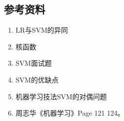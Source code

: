 \documentclass[letterpaper,10pt,english]{sphinxmanual}
\begin{document}
\subsection{参考资料}
\label{\detokenize{machineLearning/02_svm:id6}}\begin{enumerate}
\item {} 
LR与SVM的异同

\end{enumerate}
\begin{quote}

\end{quote}
\begin{enumerate}
\setcounter{enumi}{1}
\item {} 
核函数

\end{enumerate}
\begin{quote}

\end{quote}
\begin{enumerate}
\setcounter{enumi}{2}
\item {} 
SVM面试题

\end{enumerate}
\begin{quote}

\end{quote}
\begin{enumerate}
\setcounter{enumi}{3}
\item {} 
SVM的优缺点

\end{enumerate}
\begin{quote}

\end{quote}
\begin{enumerate}
\setcounter{enumi}{4}
\item {} 
机器学习技法\textendash{}SVM的对偶问题

\end{enumerate}
\begin{quote}

\end{quote}
\begin{enumerate}
\setcounter{enumi}{5}
\item {} 
周志华《机器学习》Page 121 \textendash{} 124。

\end{enumerate}
\end{document}
